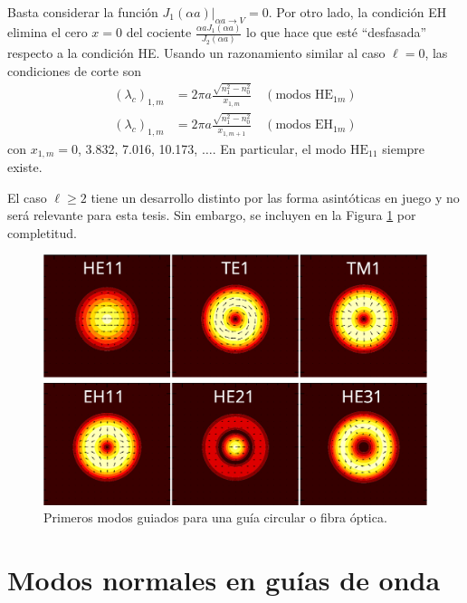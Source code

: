 Basta considerar la función $J_1(\alpha a)|_{\alpha a \to V} = 0$. Por otro lado, la condición EH elimina el cero $x=0$ del cociente $\frac{\alpha aJ_1(\alpha a)}{J_2(\alpha a)}$ lo que hace que esté ``desfasada'' respecto a la condición HE. Usando un razonamiento similar al caso $\ell =0$, las condiciones de corte son
\begin{align*}
	(\lambda_c)_{1,m} &= 2\pi a \frac{\sqrt{n_1^2 - n_0^2}}{x_{1,m}} \quad \left(\text{modos HE}_{1m}\right)
	\\
	(\lambda_c)_{1,m} &= 2\pi a \frac{\sqrt{n_1^2 - n_0^2}}{x_{1,m+1}} \quad \left(\text{modos EH}_{1m}\right)
\end{align*}
con $x_{1,m}=0$, 3.832,  7.016, 10.173, $\dots$.
En particular, el modo $\text{HE}_{11}$ siempre existe.

El caso $\ell \ge 2$ tiene un desarrollo distinto por las forma asintóticas en juego y no será relevante para esta tesis. Sin embargo, se incluyen en la Figura \ref{fig:vortices} por completitud.
\begin{figure}[H]
	\includegraphics[width=\linewidth]{media/OAM_analitic}
		\caption{Primeros modos guiados para una guía circular o fibra óptica. \label{fig:vortices}}
\end{figure}

\section{Modos normales en guías de onda}


